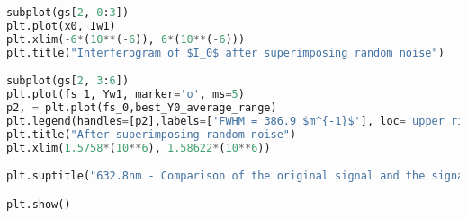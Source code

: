 \documentclass[conference]{IEEEtran}
\begin{document}
\begin{lstlisting}[language=python]
subplot(gs[2, 0:3])
plt.plot(x0, Iw1)
plt.xlim(-6*(10**(-6)), 6*(10**(-6)))
plt.title("Interferogram of $I_0$ after superimposing random noise")

subplot(gs[2, 3:6])
plt.plot(fs_1, Yw1, marker='o', ms=5)
p2, = plt.plot(fs_0,best_Y0_average_range)
plt.legend(handles=[p2],labels=['FWHM = 386.9 $m^{-1}$'], loc='upper right')
plt.title("After superimposing random noise")
plt.xlim(1.5758*(10**6), 1.58622*(10**6))

plt.suptitle("632.8nm - Comparison of the original signal and the signal after adding random noise", fontsize = 20)

plt.show()

\end{lstlisting}
\end{document}
